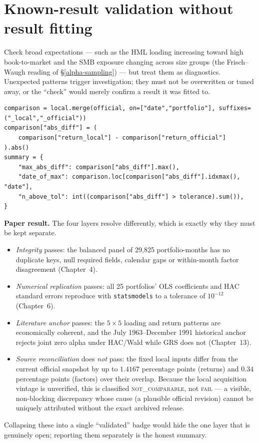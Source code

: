 \hypertarget{known-result-validation-without-result-fitting}{%
\section{Known-result validation without result
fitting}\label{known-result-validation-without-result-fitting}}

Check broad expectations --- such as the HML loading increasing toward high
book-to-market and the SMB exposure changing across size groups (the
Frisch--Waugh reading of \S\ref{alpha-sampling}) --- but treat them as
diagnostics. Unexpected patterns trigger investigation; they must not be
overwritten or tuned away, or the ``check'' would merely confirm a
result it was fitted to.

\begin{verbatim}
comparison = local.merge(official, on=["date","portfolio"], suffixes=("_local","_official"))
comparison["abs_diff"] = (
    comparison["return_local"] - comparison["return_official"]
).abs()
summary = {
    "max_abs_diff": comparison["abs_diff"].max(),
    "date_of_max": comparison.loc[comparison["abs_diff"].idxmax(), "date"],
    "n_above_tol": int((comparison["abs_diff"] > tolerance).sum()),
}
\end{verbatim}

\textbf{Paper result.} The four layers resolve differently, which is
exactly why they must be kept separate.
\begin{itemize}
\tightlist
\item
  \emph{Integrity} passes: the balanced panel of 29{,}825 portfolio-months
  has no duplicate keys, null required fields, calendar gaps or
  within-month factor disagreement (Chapter~4).
\item
  \emph{Numerical replication} passes: all 25 portfolios' OLS coefficients
  and HAC standard errors reproduce with \texttt{statsmodels} to a
  tolerance of $10^{-12}$ (Chapter~6).
\item
  \emph{Literature anchor} passes: the $5\times5$ loading and return
  patterns are economically coherent, and the July 1963--December 1991
  historical anchor rejects joint zero alpha under HAC/Wald while GRS does
  not (Chapter~13).
\item
  \emph{Source reconciliation} does \emph{not} pass: the fixed local inputs
  differ from the current official snapshot by up to $1.4167$ percentage
  points (returns) and $0.34$ percentage points (factors) over their
  overlap. Because the local acquisition vintage is unverified, this is
  classified \textsc{not\_comparable}, not \textsc{fail} --- a visible,
  non-blocking discrepancy whose cause (a plausible official revision)
  cannot be uniquely attributed without the exact archived release.
\end{itemize}
Collapsing these into a single ``validated'' badge would hide the one layer
that is genuinely open; reporting them separately is the honest summary.

